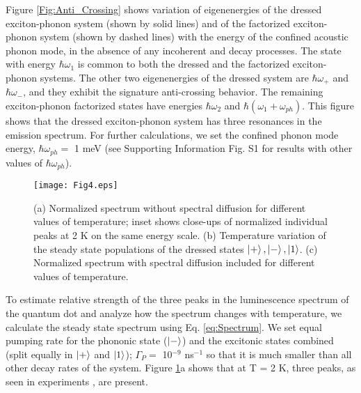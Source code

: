 \documentclass[aps,pra,preprint,groupedaddress]{revtex4-1}
\begin{document}
Figure \ref{Fig:Anti_Crossing} shows variation of eigenenergies of the dressed exciton-phonon system (shown by solid lines) and of the factorized exciton-phonon system (shown by dashed lines) with the energy of the confined acoustic phonon mode, in the absence of any incoherent and decay processes. The state with energy $\hbar\omega_{1}$ is common to both the dressed and the factorized exciton-phonon systems. The other two eigenenergies of the dressed system are $\hbar\omega_+$ and $\hbar\omega_-$, and they exhibit the signature anti-crossing behavior. The remaining exciton-phonon factorized states have energies $\hbar\omega_{2}$ and $\hbar(\omega_{1} + \omega_{ph})$. This figure shows that the dressed exciton-phonon system has three resonances in the emission spectrum. For further calculations, we set the confined phonon mode energy, $\hbar\omega_{ph} =$ 1 meV (see Supporting Information Fig. S1 for results with other values of $\hbar\omega_{ph}$).


\begin{figure}[htbp]
\texttt{[image: Fig4.eps]}
\caption{(a) Normalized spectrum without spectral diffusion for different values of temperature; inset shows close-ups of normalized individual peaks at 2 K on the same energy scale. (b) Temperature variation of the steady state populations of the dressed states $\ket{+}, \ket{-}, \ket{1}$. (c) Normalized spectrum with spectral diffusion included for different values of temperature.}
\label{Fig:Spectrum}
\end{figure}

To estimate relative strength of the three peaks in the luminescence spectrum of the quantum dot and analyze how the spectrum changes with temperature, we calculate the steady state spectrum using Eq. \ref{eq:Spectrum}. We set equal pumping rate for the phononic state ($\ket{-}$) and the excitonic states combined (split equally in $\ket{+}$ and $\ket{1}$); $\Gamma_P =$ 10$^{-9}$ ns$^{-1}$ so that it is much smaller than all other decay rates of the system. Figure \ref{Fig:Spectrum}a shows that at T = 2 K, three peaks, as seen in experiments \cite{Biadala2009}, are present. 
\end{document}
